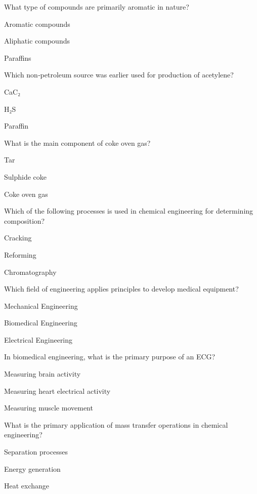 \begin{enhancedmcq}{What type of compounds are primarily aromatic in nature?}
\item Aromatic compounds
\item Aliphatic compounds
\item Paraffins

\end{enhancedmcq}
\begin{enhancedmcq}{Which non‑petroleum source was earlier used for production of acetylene?}
\item CaC₂
\item H₂S
\item Paraffin

\end{enhancedmcq}
\begin{enhancedmcq}{What is the main component of coke oven gas?}
\item Tar
\item Sulphide coke
\item Coke oven gas

\end{enhancedmcq}
\begin{enhancedmcq}{Which of the following processes is used in chemical engineering for determining composition?}
\item Cracking
\item Reforming
\item Chromatography

\end{enhancedmcq}
\begin{enhancedmcq}{Which field of engineering applies principles to develop medical equipment?}
\item Mechanical Engineering
\item Biomedical Engineering
\item Electrical Engineering

\end{enhancedmcq}
\begin{enhancedmcq}{In biomedical engineering, what is the primary purpose of an ECG?}
\item Measuring brain activity
\item Measuring heart electrical activity
\item Measuring muscle movement

\end{enhancedmcq}
\begin{enhancedmcq}{What is the primary application of mass transfer operations in chemical engineering?}
\item Separation processes
\item Energy generation
\item Heat exchange

\end{enhancedmcq}
